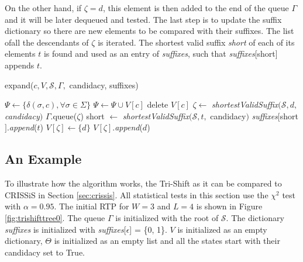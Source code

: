 {On the other hand, if $\zeta = d$, this element is then added to the end of the queue $\Gamma$ and it will be later dequeued and tested.  The last step is to update the suffix dictionary so there are new elements to be compared with their suffixes. The list ofall the descendants of $\zeta$ is iterated. The shortest valid suffix \textit{short} of each of its elements $t$ is found and used as an entry of \textit{suffixes}, such that \textit{suffixes}[short] appends $t$.
  
  \begin{algorithm}
  \caption{expand($c, V, \mathcal{S},\Gamma,$ candidacy, suffixes)\label{alg:expand}}
    \begin{algorithmic}[1]
      	\State $\Psi \gets \{\delta(\sigma,c),\forall \sigma \in \Sigma\}$
      		\State $\Psi \gets \Psi \cup V[c]$
      		\State delete $V[c]$
      	\EndIf
      		\State $\zeta \gets $ \textit{shortestValidSuffix}$(\mathcal{S}, d,$ \textit{candidacy}$)$
      			\State $\Gamma$.queue($\zeta$)
      				\State short $\gets $ \textit{shortestValidSuffix}$(\mathcal{S}, t,$ candidacy$)$
      				\State \textit{suffixes}$[$short$]$.\textit{append}($t$)
      			\EndFor
      		\Else
      				\State $V[\zeta] \gets \{d\}$
      			\Else
      				\State $V[\zeta]$.\textit{append}($d$)
      			\EndIf
      		\EndIf
      	\EndFor
      \EndProcedure
    \end{algorithmic}
  \end{algorithm}

\subsection{An Example}

To illustrate how the algorithm works, the Tri-Shift as it can be compared to CRISSiS in Section \ref{sec:crissis}. All statistical tests in this section use the $\chi^2$ test with $\alpha = 0.95$. The initial RTP for $W = 3$ and $L = 4$ is shown in Figure \ref{fig:trishifttree0}. The queue $\Gamma$ is initialized with the root of $\mathcal{S}$. The dictionary \textit{suffixes} is initialized with  \textit{suffixes}[$\epsilon$] = \{0, 1\}. $V$ is initialized as an empty dictionary, $\Theta$ is initialized as an empty list and all the states start with their candidacy set to True.

}
